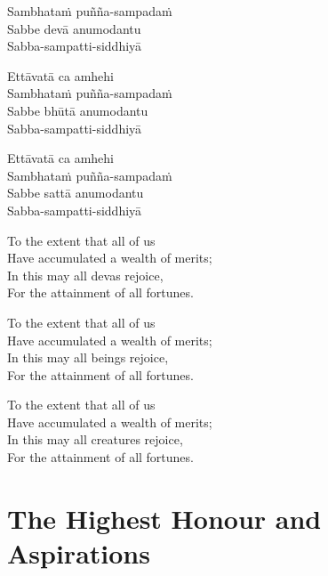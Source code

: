 \vspace{-1.0em}

Sambhataṁ puñña-sampadaṁ\\
Sabbe devā anumodantu\\
Sabba-sampatti-siddhiyā

Ettāvatā ca amhehi\\
Sambhataṁ puñña-sampadaṁ\\
Sabbe bhūtā anumodantu\\
Sabba-sampatti-siddhiyā

Ettāvatā ca amhehi\\
Sambhataṁ puñña-sampadaṁ\\
Sabbe sattā anumodantu\\
Sabba-sampatti-siddhiyā


\clearpage

\begin{english-verses}
  To the extent that all of us\\
  Have accumulated a wealth of merits;\\
  In this may all devas rejoice,\\
  For the attainment of all fortunes.
\end{english-verses}

\begin{english-verses}
  To the extent that all of us\\
  Have accumulated a wealth of merits;\\
  In this may all beings rejoice,\\
  For the attainment of all fortunes.
\end{english-verses}

\begin{english-verses}
  To the extent that all of us\\
  Have accumulated a wealth of merits;\\
  In this may all creatures rejoice,\\
  For the attainment of all fortunes.
\end{english-verses}


\section{The Highest Honour and Aspirations}
\label{highest-honour-aspirations}

